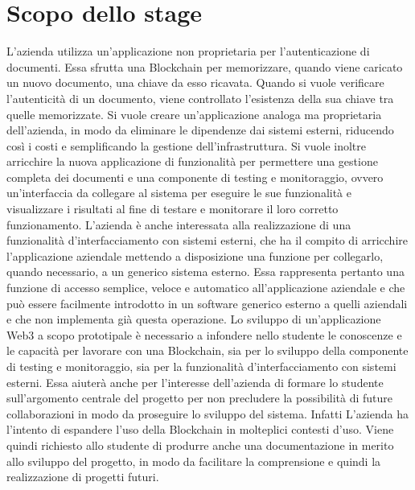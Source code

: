 \section*{Scopo dello stage}
L'azienda utilizza un'applicazione non proprietaria per l'autenticazione di documenti. Essa sfrutta una Blockchain per memorizzare, quando viene caricato un nuovo documento, una chiave da esso ricavata. Quando si vuole verificare l'autenticità di un documento, viene controllato l'esistenza della sua chiave tra quelle memorizzate.
\newline
Si vuole creare un'applicazione analoga ma proprietaria dell'azienda, in modo da eliminare le dipendenze dai sistemi esterni, riducendo così i costi e semplificando la gestione dell'infrastruttura. Si vuole inoltre arricchire la nuova applicazione di funzionalità per permettere una gestione completa dei documenti e una componente di testing e monitoraggio, ovvero un'interfaccia da collegare al sistema per eseguire le sue funzionalità e visualizzare i risultati al fine di testare e monitorare il loro corretto funzionamento. L'azienda è anche interessata alla realizzazione di una funzionalità d'interfacciamento con sistemi esterni, che ha il compito di arricchire l'applicazione aziendale mettendo a disposizione una funzione per collegarlo, quando necessario, a un generico sistema esterno. Essa rappresenta pertanto una funzione di accesso semplice, veloce e automatico all'applicazione aziendale e che può essere facilmente introdotto in un software generico esterno a quelli aziendali e che non implementa già questa operazione.
\newline
Lo sviluppo di un'applicazione Web3 a scopo prototipale è necessario a infondere nello studente le conoscenze e le capacità per lavorare con una Blockchain, sia per lo sviluppo della componente di testing e monitoraggio, sia per la funzionalità d'interfacciamento con sistemi esterni. Essa aiuterà anche per l'interesse dell'azienda di formare lo studente sull'argomento centrale del progetto per non precludere la possibilità di future collaborazioni in modo da proseguire lo sviluppo del sistema. Infatti L'azienda ha l'intento di espandere l'uso della Blockchain in molteplici contesti d'uso. Viene quindi richiesto allo studente di produrre anche una documentazione in merito allo sviluppo del progetto, in modo da facilitare la comprensione e quindi la realizzazione di progetti futuri.